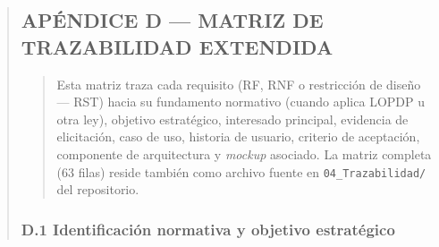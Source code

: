 \documentclass[
]{article}
\begin{document}
\begin{quote}

\subsection{APÉNDICE D --- MATRIZ DE TRAZABILIDAD EXTENDIDA}\label{apendice-d-matriz-trazabilidad}

\begin{quote}
Esta matriz traza cada requisito (RF, RNF o restricción de diseño --- RST) hacia su
fundamento normativo (cuando aplica LOPDP u otra ley), objetivo estratégico,
interesado principal, evidencia de elicitación, caso de uso, historia de usuario,
criterio de aceptación, componente de arquitectura y \emph{mockup} asociado. La matriz
completa (63 filas) reside también como archivo fuente en
\texttt{04\_Trazabilidad/} del repositorio.
\end{quote}

\subsubsection{D.1 Identificación normativa y objetivo estratégico}\label{d1-identificacion-normativa}


\end{quote}
\end{document}
